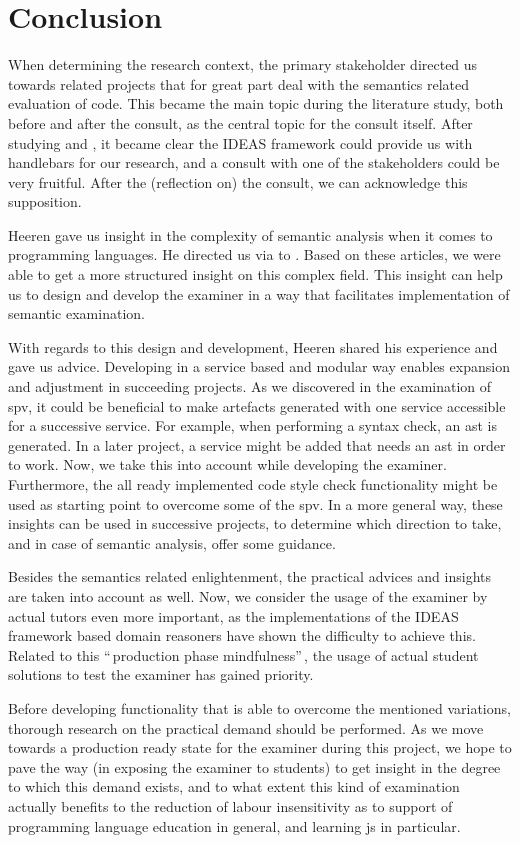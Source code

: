 \section{Conclusion}
When determining the research context, the primary stakeholder directed us 
towards related projects that for great part deal with the semantics related
evaluation of \gls{code}. This became the main topic during the literature 
study, both before and after the consult, as the central topic for the consult
itself. After studying \citep{gerdes2012ask} and \citep{heeren2010specifying},
it became clear the IDEAS framework could provide us with handlebars for our
research, and a consult with one of the stakeholders could be very fruitful. 
After the (reflection on) the consult, we can acknowledge this supposition.


Heeren gave us insight in the complexity of semantic analysis when it comes to
programming languages. He directed us via \citep{keuning2014strategy} to 
\citep{xu2003transformation}. Based on these articles, we were able to get a
more structured insight on this complex field. This insight can help us to 
design and develop the \gls{examiner} in a way that facilitates implementation 
of semantic examination.


With regards to this design and development, Heeren shared his experience and
gave us advice. Developing in a service based and modular way enables expansion
and adjustment in succeeding projects. As we discovered in the examination of 
\gls{spv}, it could be beneficial to make artefacts generated with one 
service accessible for a successive service. For example, when performing a
syntax check, an \gls{ast} is generated. In a later project, a service
might be added that needs an \gls{ast} in order to work. Now, we take this into
account while developing the \gls{examiner}. Furthermore, the all ready 
implemented code style check functionality might be used as starting point to
overcome some of the \gls{spv}. In a more general way, these insights can be
used in successive projects, to determine which direction to take, and in case
of semantic analysis, offer some guidance.


Besides the semantics related enlightenment, the practical advices and insights
are taken into account as well. Now, we consider the usage of the 
\gls{examiner} by actual \glspl{tutor} even more important, as the 
implementations of the IDEAS framework based domain reasoners have shown the
difficulty to achieve this. Related to this ``\,production phase mindfulness''\,, 
the usage of actual student solutions to test the \gls{examiner} has gained 
priority. 


Before developing functionality that is able to overcome the mentioned 
variations, thorough research on the practical demand should be performed. 
As we move towards a production ready state for the \gls{examiner} during
this project, we hope to pave the way (in exposing the \gls{examiner} to 
students) to get insight in the degree to which this demand exists, and to what 
extent this kind of examination actually benefits to the reduction of labour 
insensitivity as to support of programming language education in general, and 
learning \gls{js} in particular.
